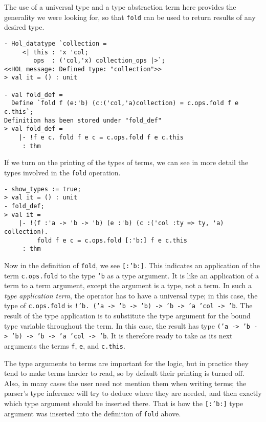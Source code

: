 The use of a  universal type and a type abstraction term here provides the generality we
were looking for, so that \texttt{fold} can be used to return results of any desired type.

\begin{session}
\begin{verbatim}
- Hol_datatype `collection =
     <| this : 'x 'col;
        ops  : ('col,'x) collection_ops |>`;
<<HOL message: Defined type: "collection">>
> val it = () : unit

- val fold_def =
  Define `fold f (e:'b) (c:('col,'a)collection) = c.ops.fold f e c.this`;
Definition has been stored under "fold_def"
> val fold_def =
    |- !f e c. fold f e c = c.ops.fold f e c.this
     : thm
\end{verbatim}
\end{session}

If we turn on the printing of the types of terms, we can see in more detail
the types involved in the \texttt{fold} operation.
\begin{session}
\begin{verbatim}
- show_types := true;
> val it = () : unit
- fold_def;
> val it =
    |- !(f :'a -> 'b -> 'b) (e :'b) (c :('col :ty => ty, 'a) collection).
         fold f e c = c.ops.fold [:'b:] f e c.this
     : thm
\end{verbatim}
\end{session}

Now in the definition of \texttt{fold},
we see \texttt{[:'b:]}.  This indicates an application of
the term \texttt{c.ops.fold} to the type \texttt{'b} as a type argument.
It is like an application of a term to a term argument, except the argument is a type,
not a term.  In such a {\it type application term}, the operator has to have a
universal type; in this case, the type of \texttt{c.ops.fold} is
\texttt{!'b.~('a~->~'b~->~'b) -> 'b -> 'a 'col -> 'b}. The result of the type
application is to substitute the type argument for the bound type variable throughout
the term.  In this case, the result has type
\texttt{('a~->~'b~->~'b) -> 'b -> 'a 'col -> 'b}.
It is therefore ready to take as its next arguments the terms \texttt{f}, \texttt{e},
and \texttt{c.this}.

The type arguments to terms are important for the logic, but in practice they tend to
make terms harder to read, so by default their printing is turned off.
Also, in many cases the user need not mention them when writing terms;
the parser's type inference will try to deduce where they are needed,
and then exactly which type argument should be inserted there.
That is how the \texttt{[:'b:]} type argument was inserted into the definition of
\texttt{fold} above.

